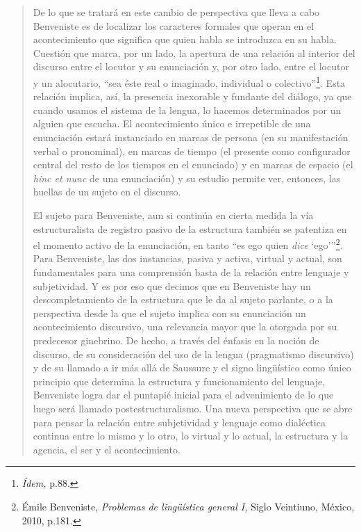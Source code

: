 \begin{quote}
De lo que se tratará en este cambio de perspectiva que lleva a cabo Benveniste es de localizar los caracteres formales que operan en el acontecimiento que significa que quien habla se introduzca en su habla. Cuestión que marca, por un lado, la apertura de una relación al interior del discurso entre el locutor y su enunciación y, por otro lado, entre el locutor y un alocutario, \enquote{sea éste real o imaginado, individual o colectivo}\footnote{\emph{Ídem,} p.88.}. Esta relación implica, así, la presencia inexorable y fundante del diálogo, ya que cuando usamos el sistema de la lengua, lo hacemos determinados por un alguien que escucha. El acontecimiento único e irrepetible de una enunciación estará instanciado en marcas de persona (en su manifestación verbal o pronominal), en marcas de tiempo (el presente como configurador central del resto de los tiempos en el enunciado) y en marcas de espacio (el \emph{hinc et nunc} de una enunciación) y su estudio permite ver, entonces, las huellas de un sujeto en el discurso.

El sujeto para Benveniste, aun si continúa en cierta medida la vía estructuralista de registro pasivo de la estructura  también se patentiza en el momento activo de la enunciación, en tanto \enquote{es ego quien \emph{dice} \enquote{ego}}\footnote{Émile Benveniste, \emph{Problemas de lingüística general I,} Siglo Veintiuno, México, 2010, p.181.}. Para Benveniste, las dos instancias, pasiva y activa, virtual y actual, son fundamentales para una comprensión basta de la relación entre lenguaje y subjetividad. Y es por eso que decimos que en Benveniste hay un descompletamiento de la estructura que le da al sujeto parlante, o a la perspectiva desde la que el sujeto implica con su enunciación un acontecimiento discursivo, una relevancia mayor que la otorgada por su predecesor ginebrino. De hecho, a través del énfasis en la noción de discurso, de su consideración del uso de la lengua (pragmatismo discursivo) y de su llamado a ir más allá de Saussure y el signo lingüístico como único principio que determina la estructura y funcionamiento del lenguaje, Benveniste logra dar el puntapié inicial para el advenimiento de lo que luego será llamado postestructuralismo. Una nueva perspectiva que se abre para pensar la relación entre subjetividad y lenguaje como dialéctica continua entre lo mismo y lo otro, lo virtual y lo actual, la estructura y la agencia, el ser y el acontecimiento.


\end{quote}
